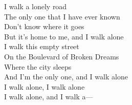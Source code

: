 I walk a lonely road \\
The only one that I have ever known \\
Don't know where it goes \\
But it's home to me, and I walk alone \\
I walk this empty street \\
On the Boulevard of Broken Dreams \\
Where the city sleeps \\
And I'm the only one, and I walk alone \\[1em]
I walk alone, I walk alone \\
I walk alone, and I walk a— 
